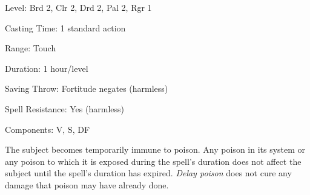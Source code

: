 
\begin{description*}
\item[Level:] Brd 2, Clr 2, Drd 2, Pal 2, Rgr 1
\item[Casting Time:] 1 standard action
\item[Range:] Touch
\item[Duration:] 1 hour/level
\item[Saving Throw:] Fortitude negates (harmless)
\item[Spell Resistance:] Yes (harmless)
\item[Components:] V, S, DF
\end{description*}

The subject becomes temporarily immune to poison. Any poison in its system or any
poison to which it is exposed during the spell's duration does not affect the subject
until the spell's duration has expired. \textit{Delay poison} does not cure any
damage that poison may have already done.